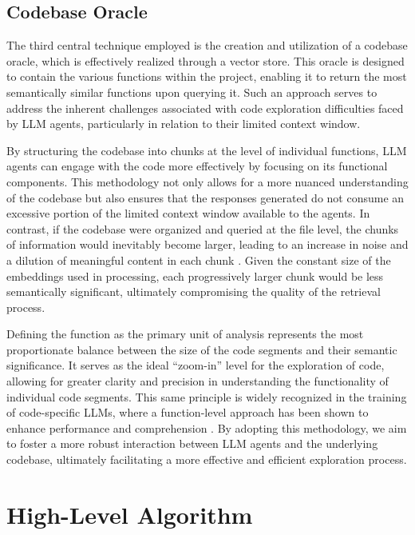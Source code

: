 \documentclass[
  a4paper,
]{scrreprt}
\theoremstyle{definition}
\theoremstyle{remark}
\begin{document}
\subsection{Codebase Oracle}\label{sec-oracle}

The third central technique employed is the creation and utilization of
a codebase oracle, which is effectively realized through a vector store.
This oracle is designed to contain the various functions within the
project, enabling it to return the most semantically similar functions
upon querying it. Such an approach serves to address the inherent
challenges associated with code exploration difficulties faced by LLM
agents, particularly in relation to their limited context window.

By structuring the codebase into chunks at the level of individual
functions, LLM agents can engage with the code more effectively by
focusing on its functional components. This methodology not only allows
for a more nuanced understanding of the codebase but also ensures that
the responses generated do not consume an excessive portion of the
limited context window available to the agents. In contrast, if the
codebase were organized and queried at the file level, the chunks of
information would inevitably become larger, leading to an increase in
noise and a dilution of meaningful content in each chunk
\autocite{zhao2024}. Given the constant size of the embeddings used in
processing, each progressively larger chunk would be less semantically
significant, ultimately compromising the quality of the retrieval
process.

Defining the function as the primary unit of analysis represents the
most proportionate balance between the size of the code segments and
their semantic significance. It serves as the ideal ``zoom-in'' level
for the exploration of code, allowing for greater clarity and precision
in understanding the functionality of individual code segments. This
same principle is widely recognized in the training of code-specific
LLMs, where a function-level approach has been shown to enhance
performance and comprehension \autocite{chen2021}. By adopting this
methodology, we aim to foster a more robust interaction between LLM
agents and the underlying codebase, ultimately facilitating a more
effective and efficient exploration process.

\section{High-Level Algorithm}\label{high-level-algorithm}
\end{document}
